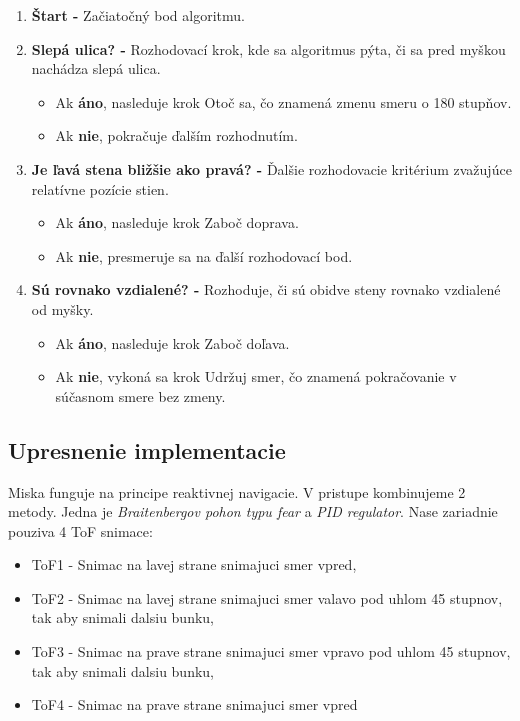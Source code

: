 \begin{enumerate}
	\item \textbf{Štart - }Začiatočný bod algoritmu.
	\item \textbf{Slepá ulica? - }Rozhodovací krok, kde sa algoritmus pýta, či sa pred myškou nachádza slepá ulica.
		\begin{itemize}
			\item Ak \textbf{áno}, nasleduje krok Otoč sa, čo znamená zmenu smeru o 180 stupňov.
			\item Ak \textbf{nie}, pokračuje ďalším rozhodnutím.
		\end{itemize}
	\item \textbf{Je ľavá stena bližšie ako pravá? - }Ďalšie rozhodovacie kritérium zvažujúce relatívne pozície stien.
		\begin{itemize}
			\item Ak \textbf{áno}, nasleduje krok Zaboč doprava.
			\item Ak \textbf{nie}, presmeruje sa na ďalší rozhodovací bod.
		\end{itemize}
	\item \textbf{Sú rovnako vzdialené? - }Rozhoduje, či sú obidve steny rovnako vzdialené od myšky.
		\begin{itemize}
			\item Ak \textbf{áno}, nasleduje krok Zaboč doľava.
			\item Ak \textbf{nie}, vykoná sa krok Udržuj smer, čo znamená pokračovanie v súčasnom smere bez zmeny.
		\end{itemize}
\end{enumerate}

\subsection{Upresnenie implementacie}
\label{subsec:upresnennie_implementacie}

Miska funguje na principe reaktivnej navigacie. V pristupe kombinujeme 2 metody. Jedna je \textit{Braitenbergov pohon
typu fear} a
\textit{PID regulator}. Nase zariadnie pouziva 4 ToF snimace:
\begin{itemize}
	\item ToF1 - Snimac na lavej strane snimajuci smer vpred,
	\item ToF2 - Snimac na lavej strane snimajuci smer valavo pod uhlom 45 stupnov, tak aby snimali dalsiu bunku,
	\item ToF3 - Snimac na prave strane snimajuci smer vpravo pod uhlom 45 stupnov, tak aby snimali dalsiu bunku,
	\item ToF4 - Snimac na prave strane snimajuci smer vpred
\end{itemize}

